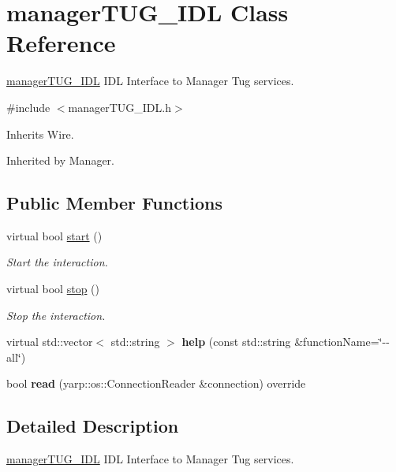 \section{manager\+T\+U\+G\+\_\+\+I\+DL Class Reference}
\label{classmanagerTUG__IDL}


\mbox{\hyperlink{classmanagerTUG__IDL}{manager\+T\+U\+G\+\_\+\+I\+DL}} I\+DL Interface to Manager Tug services.  




{\ttfamily \#include $<$manager\+T\+U\+G\+\_\+\+I\+D\+L.\+h$>$}



Inherits Wire.



Inherited by Manager.

\subsection*{Public Member Functions}
\begin{DoxyCompactItemize}
\item 
virtual bool \mbox{\hyperlink{classmanagerTUG__IDL_accbf9248b8f8f7688dba51a324624c0c}{start}} ()
\begin{DoxyCompactList}\small\item\em Start the interaction. \end{DoxyCompactList}\item 
virtual bool \mbox{\hyperlink{classmanagerTUG__IDL_a4e4054e0f008e1207c08df67eb92a6ac}{stop}} ()
\begin{DoxyCompactList}\small\item\em Stop the interaction. \end{DoxyCompactList}\item 
\mbox{\label{classmanagerTUG__IDL_ad4b8169fc41c778f6bb4d0ac75a8a455}} 
virtual std\+::vector$<$ std\+::string $>$ {\bfseries help} (const std\+::string \&function\+Name=\char`\"{}-\/-\/all\char`\"{})
\item 
\mbox{\label{classmanagerTUG__IDL_aebc7f06915a0979d419c2d6b68281fa5}} 
bool {\bfseries read} (yarp\+::os\+::\+Connection\+Reader \&connection) override
\end{DoxyCompactItemize}


\subsection{Detailed Description}
\mbox{\hyperlink{classmanagerTUG__IDL}{manager\+T\+U\+G\+\_\+\+I\+DL}} I\+DL Interface to Manager Tug services. 

